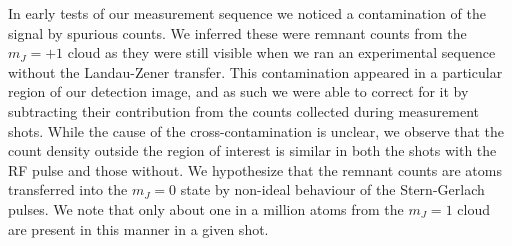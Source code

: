 	In early tests of our measurement sequence we noticed a contamination of the signal by spurious counts. 
	We inferred these were remnant counts from the $m_J=+1$ cloud as they were still visible when we ran an experimental sequence without the Landau-Zener transfer. 
	This contamination appeared in a particular region of our detection image, and as such we were able to correct for it by subtracting their contribution from the counts collected during measurement shots. 
	While the cause of the cross-contamination is unclear, we observe that the count density outside the region of interest is similar in both the shots with the RF pulse and those without. 
	We hypothesize that the remnant counts are atoms transferred into the $m_J=0$ state by non-ideal behaviour of the Stern-Gerlach pulses. 
	We note that only about one in a million atoms from the $m_J=1$ cloud are present in this manner in a given shot.


